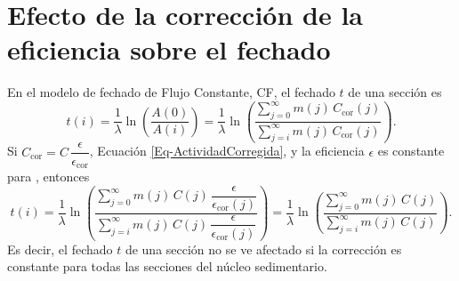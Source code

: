 \chapter{Efecto de la corrección de la eficiencia sobre el fechado}\label{ApexCorreccionEficiencia}
\lettrine{E}{}n el modelo de fechado de Flujo Constante, CF, el fechado $t$ de una sección es 
\begin{equation}
t(i) = \dfrac{1}{\lambda} \ln\left(\dfrac{A(0)}{A(i)}\right) = \dfrac{1}{\lambda}\ln\left( \dfrac{\sum_{j=0}^\infty m(j)\,C_\text{cor}(j)  }{\sum_{j=i}^\infty m(j)\,C_\text{cor}(j) } \right).
\end{equation}
Si $C_\text{cor} = C\,\dfrac{\epsilon}{\epsilon_\text{cor}}$, Ecuación \ref{Eq-ActividadCorregida}, y la eficiencia $\epsilon$ es constante para \PbCero, entonces
\begin{equation}
t(i) = \dfrac{1}{\lambda}\ln\left( \dfrac{\sum_{j=0}^\infty m(j)\,C(j)\,\dfrac{\epsilon}{\epsilon_\text{cor}(j)}}{\sum_{j=i}^\infty m(j)\,C(j)\,\dfrac{\epsilon}{\epsilon_\text{cor}(j)} } \right) = \dfrac{1}{\lambda}\ln\left( \dfrac{\sum_{j=0}^\infty m(j)\,C(j)}{\sum_{j=i}^\infty m(j)\,C(j) } \right).
\end{equation}
Es decir, el fechado $t$ de una sección no se ve afectado si la corrección es constante para todas las secciones del núcleo sedimentario.